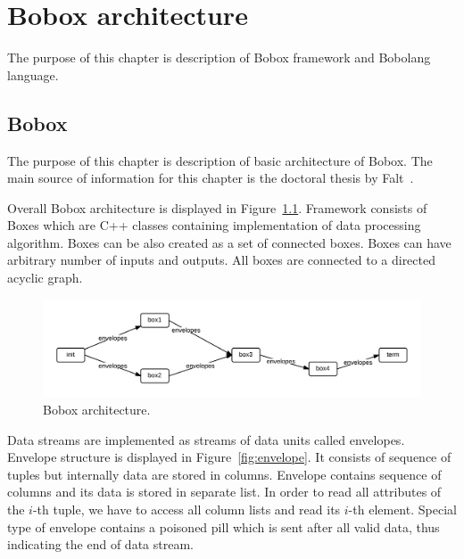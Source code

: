 \chapter{Bobox architecture}
\label{boboxarchitecture}
The purpose of this chapter is description of Bobox framework and Bobolang language.
\section{Bobox}

The purpose of this chapter is description of basic architecture of Bobox. The main source of information for this chapter is the doctoral thesis by Falt~\cite{faltthesis}. 

Overall Bobox architecture is displayed in Figure~\ref{fig:bobox}. Framework consists of Boxes which are C++ classes containing implementation of data processing algorithm. Boxes can be also created as a set of connected boxes. Boxes can have arbitrary number of inputs and outputs. All boxes are connected to a directed acyclic graph.  

\begin{figure}[h!]
  \centering
    \includegraphics[width=1\textwidth]{bobox}

      \caption{Bobox architecture.}
          \label{fig:bobox}
\end{figure}

Data streams are implemented as streams of data units called envelopes. Envelope structure is displayed in Figure~\ref{fig:envelope}. It consists of sequence of tuples but internally data are stored in columns. Envelope contains sequence of columns and its data is stored in separate list. In order to read all attributes of the $i$-th tuple, we have to access all column lists and read its $i$-th element. Special type of envelope contains a poisoned pill which is sent after all valid data, thus indicating the end of data stream. 


